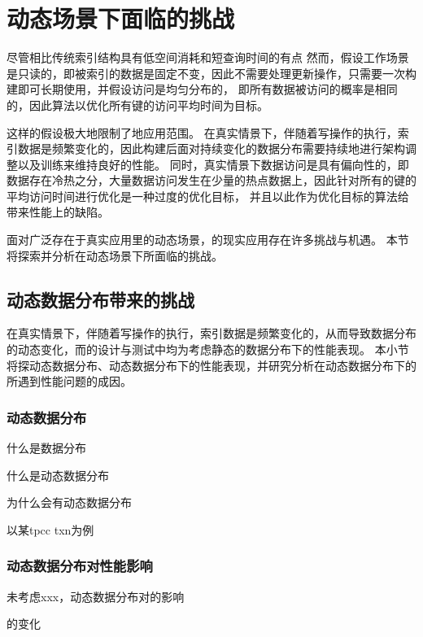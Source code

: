 \chapter{动态场景下{\li}面临的挑战}
\label{chap:challenge}

尽管{\li}相比传统索引结构具有低空间消耗和短查询时间的有点
然而，{\li}假设工作场景是只读的，即被索引的数据是固定不变，因此不需要处理更新操作，{\li}只需要一次构建即可长期使用，并假设访问是均匀分布的，
即所有数据被访问的概率是相同的，因此{\li}算法以优化所有键的访问平均时间为目标。

这样的假设极大地限制了{\li}地应用范围。
在真实情景下，伴随着写操作的执行，索引数据是频繁变化的，因此{\li}构建后面对持续变化的数据分布需要持续地进行架构调整以及训练来维持良好的{\li}性能。
同时，真实情景下数据访问是具有偏向性的，即数据存在冷热之分，大量数据访问发生在少量的热点数据上，因此针对所有的键的平均访问时间进行优化是一种过度的优化目标，
并且以此作为优化目标的算法给{\li}带来性能上的缺陷。

面对广泛存在于真实应用里的动态场景，{\li}的现实应用存在许多挑战与机遇。
本节将探索并分析{\li}在动态场景下所面临的挑战。

\section{动态数据分布带来的挑战}
\label{sec:dist-challenge}

在真实情景下，伴随着写操作的执行，索引数据是频繁变化的，从而导致数据分布的动态变化，而{\li}的设计与测试中均为考虑静态的数据分布下的性能表现。
本小节将探动态数据分布、动态数据分布下{\li}的性能表现，并研究分析{\li}在动态数据分布下的所遇到性能问题的成因。

\subsection{动态数据分布}

什么是数据分布

什么是动态数据分布

为什么会有动态数据分布

以某tpcc txn为例

\subsection{动态数据分布对{\li}性能影响}

{\li}未考虑xxx，动态数据分布对{\li}的影响

{\cdf}的变化

